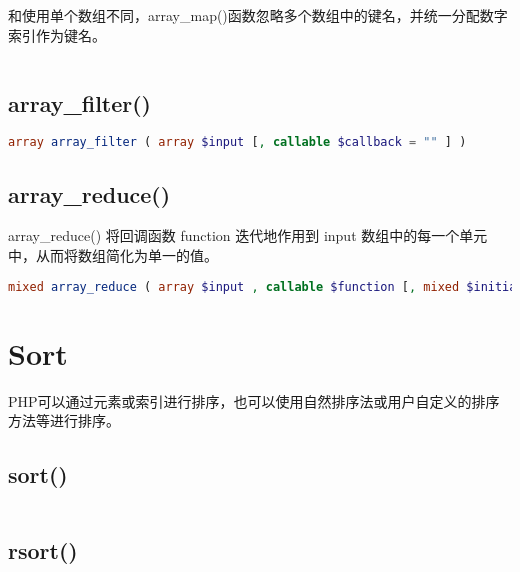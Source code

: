 和使用单个数组不同，array\_map()函数忽略多个数组中的键名，并统一分配数字索引作为键名。


\begin{lstlisting}[language=PHP]

\end{lstlisting}


\subsection{array\_filter()}



\begin{lstlisting}[language=PHP]
array array_filter ( array $input [, callable $callback = "" ] )
\end{lstlisting}

\subsection{array\_reduce()}

array\_reduce() 将回调函数 function 迭代地作用到 input 数组中的每一个单元中，从而将数组简化为单一的值。

\begin{lstlisting}[language=PHP]
mixed array_reduce ( array $input , callable $function [, mixed $initial = NULL ] )
\end{lstlisting}



\section{Sort}

PHP可以通过元素或索引进行排序，也可以使用自然排序法或用户自定义的排序方法等进行排序。

\subsection{sort()}


\begin{lstlisting}[language=PHP]

\end{lstlisting}


\subsection{rsort()}


\begin{lstlisting}[language=PHP]

\end{lstlisting}


